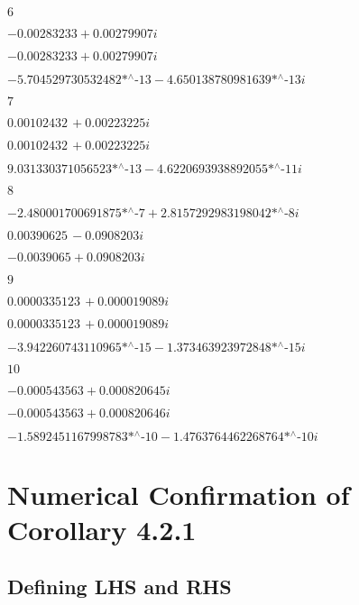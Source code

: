 \noindent\(6\)

\noindent\(-0.00283233+0.00279907 i\)

\noindent\(-0.00283233+0.00279907 i\)

\noindent\(-\text{5.704529730532482$\grave{ }$*${}^{\wedge}$-13}-\text{4.650138780981639$\grave{ }$*${}^{\wedge}$-13} i\)

\noindent\(7\)

\noindent\(0.00102432\, +0.00223225 i\)

\noindent\(0.00102432\, +0.00223225 i\)

\noindent\(\text{9.031330371056523$\grave{ }$*${}^{\wedge}$-13}-\text{4.6220693938892055$\grave{ }$*${}^{\wedge}$-11} i\)

\noindent\(8\)

\noindent\(-\text{2.480001700691875$\grave{ }$*${}^{\wedge}$-7}+\text{2.8157292983198042$\grave{ }$*${}^{\wedge}$-8} i\)

\noindent\(0.00390625\, -0.0908203 i\)

\noindent\(-0.0039065+0.0908203 i\)

\noindent\(9\)

\noindent\(0.0000335123\, +0.000019089 i\)

\noindent\(0.0000335123\, +0.000019089 i\)

\noindent\(-\text{3.942260743110965$\grave{ }$*${}^{\wedge}$-15}-\text{1.373463923972848$\grave{ }$*${}^{\wedge}$-15} i\)

\noindent\(10\)

\noindent\(-0.000543563+0.000820645 i\)

\noindent\(-0.000543563+0.000820646 i\)

\noindent\(-\text{1.5892451167998783$\grave{ }$*${}^{\wedge}$-10}-\text{1.4763764462268764$\grave{ }$*${}^{\wedge}$-10} i\)

\section*{Numerical Confirmation of Corollary 4.2.1}

\subsection*{Defining LHS and RHS}

